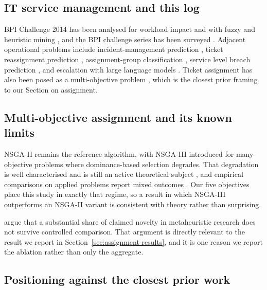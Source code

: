 \subsection{IT service management and this log}

BPI Challenge 2014 \citep{dongen2014challenge} has been analysed for workload impact
\citep{dees2014predictive} and with fuzzy and heuristic mining
\citep{andreswari2023analysis}, and the BPI challenge series has been surveyed
\citep{lopes2019survey}. Adjacent operational problems include incident-management
prediction \citep{sarnovsk2018predictive}, ticket reassignment prediction
\citep{schad2022predicting}, assignment-group classification \citep{gassel2024evaluating},
service level breach prediction \citep{gouryraj2021service,swain2023factors}, and escalation
with large language models \citep{liu2025tickit}. Ticket assignment has also been posed as a
multi-objective problem \citep{arain2026novel}, which is the closest prior framing to our
Section on assignment.

\subsection{Multi-objective assignment and its known limits}

NSGA-II \citep{deb2002fast} remains the reference algorithm, with NSGA-III
\citep{debjain2014evolutionary} introduced for many-objective problems where dominance-based
selection degrades. That degradation is well characterised and is still an active theoretical
subject \citep{zheng2024runtime,doerr2026difficulties,opris2025first,alghouass2025proven},
and empirical comparisons on applied problems report mixed outcomes
\citep{santos2024performance,wolschick2024evaluating,ishibuchi2025search,wang2025nsgaii,li2025learning}.
Our five objectives place this study in exactly that regime, so a result in which NSGA-III
outperforms an NSGA-II variant is consistent with theory rather than surprising.

\citet{wang2025rethinking} argue that a substantial share of claimed novelty in metaheuristic
research does not survive controlled comparison. That argument is directly relevant to the
result we report in Section~\ref{sec:assignment-results}, and it is one reason we report the
ablation rather than only the aggregate.

\subsection{Positioning against the closest prior work}
\label{sec:positioning}

